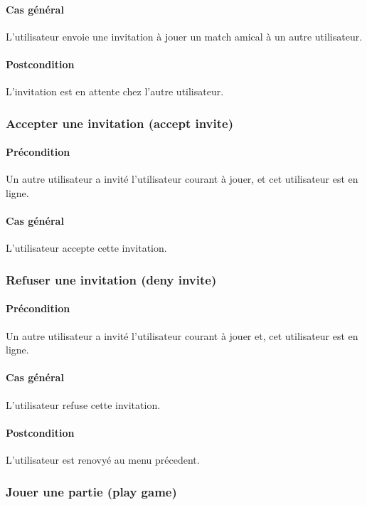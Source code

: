 \paragraph{Cas général} L'utilisateur envoie une invitation à jouer un match amical à un autre utilisateur.
\paragraph{Postcondition} L'invitation est en attente chez l'autre utilisateur.

\subsubsection{Accepter une invitation (accept invite)}

\paragraph{Précondition} Un autre utilisateur a invité l'utilisateur courant à jouer, et cet utilisateur est en ligne.
\paragraph{Cas général} L'utilisateur accepte cette invitation.

\subsubsection{Refuser une invitation (deny invite)}

\paragraph{Précondition} Un autre utilisateur a invité l’utilisateur courant à jouer et, cet utilisateur est en ligne.

\paragraph{Cas général} L’utilisateur refuse cette invitation.

\paragraph{Postcondition} L’utilisateur est renovyé au menu précedent.

\subsubsection{Jouer une partie (play game)}

